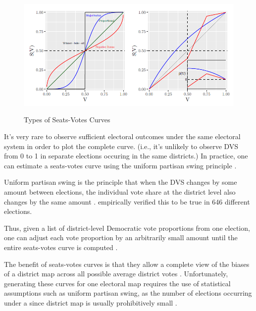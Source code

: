 \begin{figure}[hb]
    \caption{Types of Seats-Votes Curves}
    \includegraphics[width=0.8\linewidth]{img/seatsvotes.png}
    \label{fig:seatsvotes}
    \raggedright
\end{figure}

It's very rare to observe sufficient electoral outcomes under the same electoral system in order to plot the complete curve. (i.e., it's unlikely to observe DVS from 0 to 1 in separate elections occuring in the same districts.) In practice, one can estimate a seats-votes curve using the uniform partisan swing principle \parencite{tufte1973}.

Uniform partisan swing is the principle that when the DVS changes by some amount between elections, the individual vote share at the district level also changes by the same amount \parencite{tufte1973}. \textcite{katz2020} empirically verified this to be true in 646 different elections. 

Thus, given a list of district-level Democratic vote proportions from one election, one can adjust each vote proportion by an arbitrarily small amount until the entire seats-votes curve is computed \parencite{katz2020}.

The benefit of seats-votes curves is that they allow a complete view of the biases of a district map across all possible average district votes \parencite{gelman1994}. Unfortunately, generating these curves for one electoral map requires the use of statistical assumptions such as uniform partisan swing, as the number of elections occurring under a since district map is usually prohibitively small \parencite{warrington2018}.

